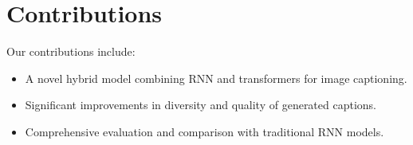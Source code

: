 \documentclass{article}
\begin{document}
\section{Contributions}
Our contributions include:
\begin{itemize}
    \item A novel hybrid model combining RNN and transformers for image captioning.
    \item Significant improvements in diversity and quality of generated captions.
    \item Comprehensive evaluation and comparison with traditional RNN models.
\end{itemize}
\end{document}

